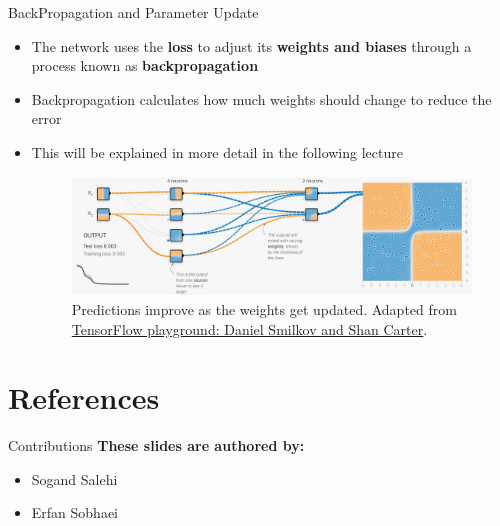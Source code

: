 \documentclass[serif, aspectratio=169]{beamer}
\begin{document}
\begin{frame}[t]{BackPropagation and Parameter Update}
	\begin{itemize}
		\item The network uses the \textbf{loss} to adjust its \textbf{weights and biases} through a process known as \textbf{backpropagation}
		\item Backpropagation calculates how much weights should change to reduce the error
		\item This will be explained in more detail in the following lecture
		      \begin{figure}[bh]
		      	\centering
		      	\includegraphics[width=\linewidth]{pic/4/tensorflow3.png} \\
		      	{\scriptsize Predictions improve as the weights get updated. Adapted from \href{playground.tensorflow.org}{TensorFlow playground: Daniel Smilkov and Shan Carter}.}
		      \end{figure}
	\end{itemize}
\end{frame}


\section{References}

\begin{frame}{Contributions}
	\textbf{These slides are authored by:}
	\begin{itemize}
		\item Sogand Salehi
		\item Erfan Sobhaei
	\end{itemize}
	    
\end{frame}


\begin{frame}[allowframebreaks]
	
	
	\nocite{*}
\end{frame}
\end{document}
